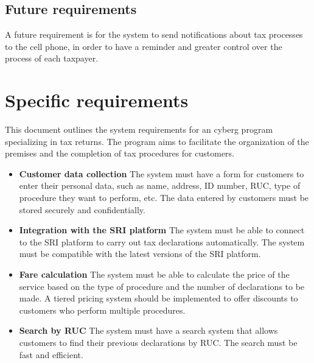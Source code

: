 \documentclass[12pt,a4paper, twosite]{article}
\begin{document}
\subsection{Future requirements}
\label{sec:org33cfcdb}

A future requirement is for the system to send notifications about tax processes to the cell phone, in order to have a reminder and greater control over the process of each taxpayer.   


\section{Specific requirements}
\label{sec:org40573d1}

This document outlines the system requirements for an cyberg program specializing in tax returns. The program aims to facilitate the organization of the premises and the completion of tax procedures for customers.

\begin{itemize}
\item
\textbf {Customer data collection}
The system must have a form for customers to enter their personal data, such as name, address, ID number, RUC, type of procedure they want to perform, etc. 
The data entered by customers must be stored securely and confidentially. 
\end{itemize}

\begin{itemize}
\item
\textbf {Integration with the SRI platform}
The system must be able to connect to the SRI platform to carry out tax declarations automatically. 
The system must be compatible with the latest versions of the SRI platform. 
\end{itemize}

\begin{itemize}
\item
\textbf {Fare calculation}
The system must be able to calculate the price of the service based on the type of procedure and the number of declarations to be made. 
A tiered pricing system should be implemented to offer discounts to customers who perform multiple procedures.
\end{itemize}

\begin{itemize}
\item
\textbf {Search by RUC}
The system must have a search system that allows customers to find their previous declarations by RUC. 
The search must be fast and efficient. 
\end{itemize}
\end{document}
